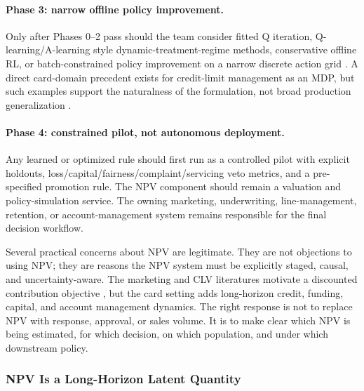 \documentclass[11pt]{article}
\newcommand{\1}{\mathbf{1}}
\begin{document}
\paragraph{Phase 3: narrow offline policy improvement.}
Only after Phases 0--2 pass should the team consider fitted Q iteration,
Q-learning/A-learning style dynamic-treatment-regime methods, conservative
offline RL, or batch-constrained policy improvement on a narrow discrete action
grid \citep{ernst2005fqi,schulte2014qlearning,laroche2019spibb,
fujimoto2019bcq,kumar2020cql}. A direct card-domain precedent exists for
credit-limit management as an MDP, but such examples support the naturalness of
the formulation, not broad production generalization
\citep{trench2003bankone,alfonsosanchez2024creditlimit}.

\paragraph{Phase 4: constrained pilot, not autonomous deployment.}
Any learned or optimized rule should first run as a controlled pilot with
explicit holdouts, loss/capital/fairness/complaint/servicing veto metrics, and a
pre-specified promotion rule. The NPV component should remain a valuation and
policy-simulation service. The owning marketing, underwriting, line-management,
retention, or account-management system remains responsible for the final
decision workflow.


Several practical concerns about NPV are legitimate. They are not objections to
using NPV; they are reasons the NPV system must be explicitly staged, causal,
and uncertainty-aware. The marketing and CLV literatures motivate a discounted
contribution objective \citep{bult1995directmail,berger1998clv,rust2004return,venkatesan2004clv},
but the card setting adds long-horizon credit, funding, capital, and account
management dynamics. The right response is not to replace NPV with response,
approval, or sales volume. It is to make clear which NPV is being estimated, for
which decision, on which population, and under which downstream policy.

\subsubsection{NPV Is a Long-Horizon Latent Quantity}
\label{subsec:npv-latent}
\end{document}
